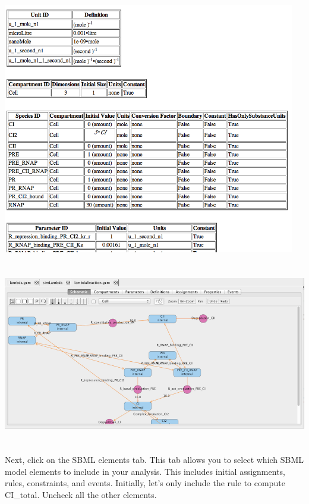 \documentclass[titlepage,11pt]{article}
\begin{document}
\begin{center}
\includegraphics[height=110mm]{screenshots/viewBrowser}
\end{center}

\begin{center}
\includegraphics[height=80mm]{screenshots/reactionModel}
\end{center}

Next, click on the SBML elements tab.  This tab allows you to select which SBML model elements to include in your analysis.  This includes initial assignments, rules, constraints, and events.  Initially, let's only include the rule to compute CI\_total.  Uncheck all the other elements.
\end{document}
